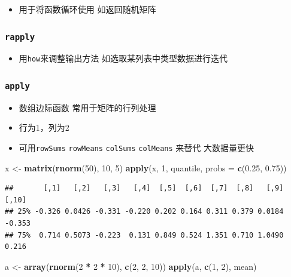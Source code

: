 \documentclass[]{book}
\newenvironment{Shaded}{\begin{snugshade}}{\end{snugshade}}
\newcommand{\DataTypeTok}[1]{\textcolor[rgb]{0.13,0.29,0.53}{#1}}
\newcommand{\DecValTok}[1]{\textcolor[rgb]{0.00,0.00,0.81}{#1}}
\newcommand{\FloatTok}[1]{\textcolor[rgb]{0.00,0.00,0.81}{#1}}
\newcommand{\KeywordTok}[1]{\textcolor[rgb]{0.13,0.29,0.53}{\textbf{#1}}}
\newcommand{\NormalTok}[1]{#1}
\newcommand{\OperatorTok}[1]{\textcolor[rgb]{0.81,0.36,0.00}{\textbf{#1}}}
\newcommand{\StringTok}[1]{\textcolor[rgb]{0.31,0.60,0.02}{#1}}
\providecommand{\tightlist}{%
  \setlength{\itemsep}{0pt}\setlength{\parskip}{0pt}}
\begin{document}
\begin{itemize}
\tightlist
\item
  用于将函数循环使用 如返回随机矩阵
\end{itemize}

\hypertarget{rapply}{%
\subsubsection{\texorpdfstring{\texttt{rapply}}{rapply}}\label{rapply}}

\begin{itemize}
\tightlist
\item
  用\texttt{how}来调整输出方法 如选取某列表中类型数据进行迭代
\end{itemize}

\hypertarget{apply}{%
\subsubsection{\texorpdfstring{\texttt{apply}}{apply}}\label{apply}}

\begin{itemize}
\tightlist
\item
  数组边际函数 常用于矩阵的行列处理
\item
  行为1，列为2
\item
  可用\texttt{rowSums} \texttt{rowMeans} \texttt{colSums} \texttt{colMeans} 来替代 大数据量更快
\end{itemize}

\begin{Shaded}
\begin{Highlighting}[]
\NormalTok{x <-}\StringTok{ }\KeywordTok{matrix}\NormalTok{(}\KeywordTok{rnorm}\NormalTok{(}\DecValTok{50}\NormalTok{), }\DecValTok{10}\NormalTok{, }\DecValTok{5}\NormalTok{)}
\KeywordTok{apply}\NormalTok{(x, }\DecValTok{1}\NormalTok{, quantile, }\DataTypeTok{probs =} \KeywordTok{c}\NormalTok{(}\FloatTok{0.25}\NormalTok{, }\FloatTok{0.75}\NormalTok{))}
\end{Highlighting}
\end{Shaded}

\begin{verbatim}
##       [,1]   [,2]   [,3]   [,4]  [,5]  [,6]  [,7]  [,8]   [,9]  [,10]
## 25% -0.326 0.0426 -0.331 -0.220 0.202 0.164 0.311 0.379 0.0184 -0.353
## 75%  0.714 0.5073 -0.223  0.131 0.849 0.524 1.351 0.710 1.0490  0.216
\end{verbatim}

\begin{Shaded}
\begin{Highlighting}[]
\NormalTok{a <-}\StringTok{ }\KeywordTok{array}\NormalTok{(}\KeywordTok{rnorm}\NormalTok{(}\DecValTok{2} \OperatorTok{*}\StringTok{ }\DecValTok{2} \OperatorTok{*}\StringTok{ }\DecValTok{10}\NormalTok{), }\KeywordTok{c}\NormalTok{(}\DecValTok{2}\NormalTok{, }\DecValTok{2}\NormalTok{, }\DecValTok{10}\NormalTok{))}
\KeywordTok{apply}\NormalTok{(a, }\KeywordTok{c}\NormalTok{(}\DecValTok{1}\NormalTok{, }\DecValTok{2}\NormalTok{), mean)}
\end{Highlighting}
\end{Shaded}
\end{document}
